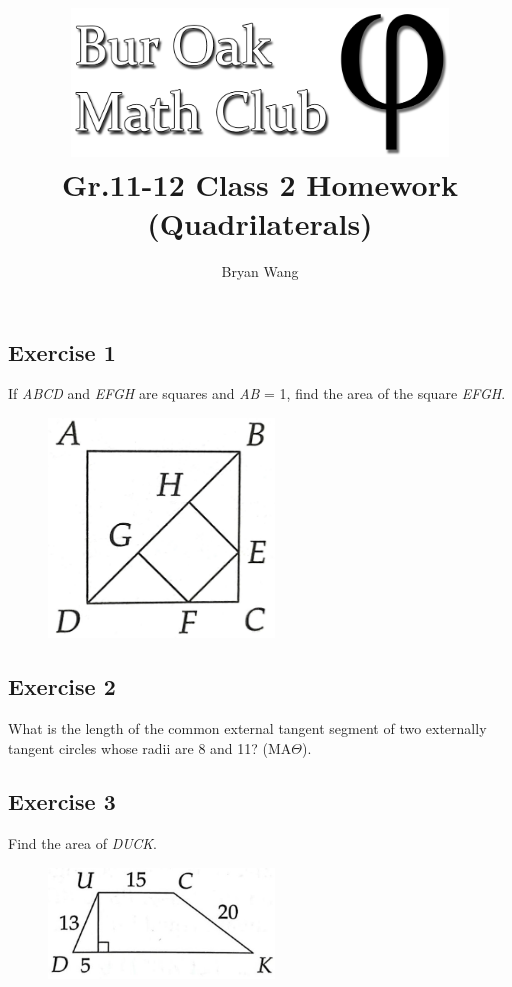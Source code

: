 \documentclass[12pt]{article}
\author{Bryan Wang}
\title{\includegraphics[width=10cm]{Bur Oak Math Club Banner Bold.png}\\\vspace{0.25in} Gr.11-12 Class 2 Homework (Quadrilaterals)}
\begin{document}
\maketitle

\subsection*{Exercise 1}
If \textit{ABCD} and \textit{EFGH} are squares and \textit{AB} = 1, find the area of the square \textit{EFGH}.
\begin{figure}[htp]
    \includegraphics[width=6cm]{img2.jpg}
\end{figure}
\vspace{1.5in} %

\subsection*{Exercise 2}
What is the length of the common external tangent segment of two externally tangent circles whose radii are 8 and 11? (MA$\Theta$).
\vspace{3in} %

\subsection*{Exercise 3}
Find the area of \textit{DUCK}.

\begin{figure}[htp]
    \includegraphics[width=6cm]{img3.jpg}
\end{figure}
\vspace{4in}
\end{document}
